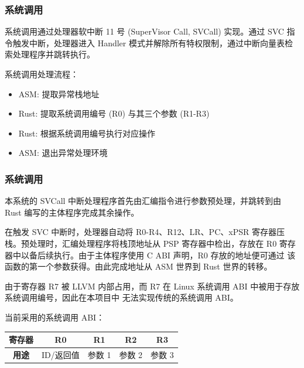 \documentclass[aspectratio=169]{beamer}
\begin{document}
\begin{frame}

    \frametitle{系统调用}

    系统调用通过处理器软中断 11 号 (SuperVisor Call, SVCall) 实现。通过 SVC 指令触发中断，处理器进入 
    Handler 模式并解除所有特权限制，通过中断向量表检索处理程序并跳转执行。

    \par

    系统调用处理流程：
    
    \begin{itemize}
        \item ASM: 提取异常栈地址
        \item Rust: 提取系统调用编号 (R0) 与其三个参数 (R1-R3)
        \item Rust: 根据系统调用编号执行对应操作
        \item ASM: 退出异常处理环境
    \end{itemize}

\end{frame}

\begin{frame}

    \frametitle{系统调用}

    \par

    本系统的 SVCall 中断处理程序首先由汇编指令进行参数预处理，并跳转到由 Rust 编写的主体程序完成其余操作。

    \par

    在触发 SVC 中断时，处理器自动将 R0-R4、R12、LR、PC、xPSR 寄存器压栈。预处理时，汇编处理程序将栈顶地址从
    PSP 寄存器中检出，存放在 R0 寄存器中以备后续执行。由于主体程序使用 C ABI 声明，R0 存放的地址便可通过
    该函数的第一个参数获得。由此完成地址从 ASM 世界到 Rust 世界的转移。

    \par

    由于寄存器 R7 被 LLVM 内部占用，而 R7 在 Linux 系统调用 ABI 中被用于存放系统调用编号，因此在本项目中
    无法实现传统的系统调用 ABI。

    \par

    当前采用的系统调用 ABI：

    \begin{center}
        \begin{tabular}{ |c|c|c|c|c| }
            \hline
            \textbf{寄存器} & R0 & R1 & R2 & R3 \\ \hline
            \textbf{用途} & ID/返回值 & 参数 1 & 参数 2 & 参数 3 \\
            \hline
        \end{tabular}
    \end{center}
    
\end{frame}
\end{document}
